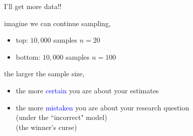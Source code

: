 \begin{lhframe}[rhgraphic={\texttt{[image: fork1\_samplesize.pdf]}}]
	{I'll get more data!!}
	
	imagine we can continue sampling,
	\begin{itemize}
		\item top: $10,000$ samples $n=20$
		\item bottom: $10,000$ samples $n=100$
	\end{itemize}

	the larger the sample size,
	\begin{itemize}
		\item the more \textcolor{blue}{certain} you are about your estimates
		\item the more \textcolor{blue}{mistaken} you are about your research question \\
		{\small (under the ``incorrect" model)}\\
		{\small \alert{(the winner's curse)}}
	\end{itemize}
\end{lhframe}
%
%
